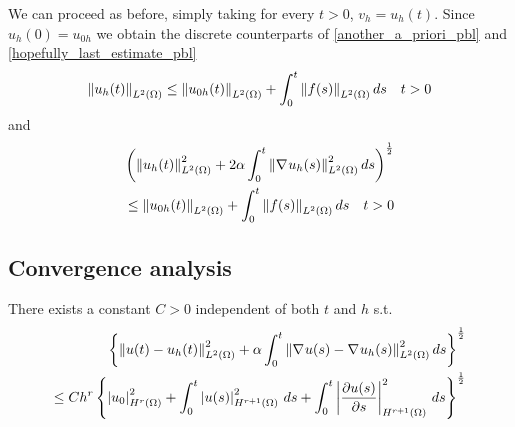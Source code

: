 We can proceed as before, simply taking for every \(t>0\), \(v_h = u_h(t)\). Since \(u_h(0) = u_{0h}\) we obtain the discrete counterparts of \eqref{another_a_priori_pbl} and \eqref{hopefully_last_estimate_pbl} 
\begin{equation}
    \norm{u_h(t)}_{L^2(\Omega)} \leq \norm{u_{0h}(t)}_{L^2(\Omega)} + \int_0^t
    \norm{f(s)}_{L^2(\Omega)} \,ds \quad t > 0
    \label{another_a_priori_disc_pbl}
\end{equation}
and 
\begin{equation}
    \begin{split}
            \left( \norm{u_h(t)}_{L^2(\Omega)}^2 + 2\alpha \int_0^t \norm{\nabla\mspace{1mu} u_h(s)}_{L^2(\Omega)}^2 \, ds\right)^{\frac{1}{2}} \\
            \leq \norm{u_{0h}(t)}_{L^2(\Omega)} + \int_0^t \norm{f(s)}_{L^2(\Omega)} \, ds \quad t > 0
    \end{split}
\end{equation}
\subsection{Convergence analysis}
\begin{theorem}
    There exists a constant \(C > 0\) independent of both \(t\) and \(h\) s.t. 
    \begin{equation*}
        \begin{split}
            \left\{ \ltwonorm{u(t) - u_h(t)}^2 + \alpha \int_0^t \ltwonorm{\grad u(s) -\grad u_h(s)}^2 \, ds \right\}^{\onehalf} \\
            \leq Ch^r \left\{ \seminorm{u_0}{H^r(\Omega)}^2 + \int_0^t \seminorm{u(s)}{H^{r+1}(\Omega)}^2 \, ds + \int_0^t \seminorm{\partialderivative{u(s)}{s}}{H^{r+1}(\Omega)}^2 \, ds \right\}^{\onehalf}
        \end{split}
    \end{equation*}
\end{theorem}
